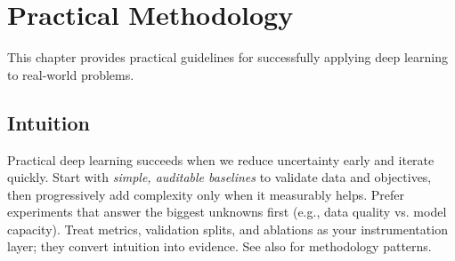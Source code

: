 
\chapter{Practical Methodology}
\label{chap:practical-methodology}

This chapter provides practical guidelines for successfully applying deep learning to real-world problems.


\begin{learningobjectives}
\end{learningobjectives}



\section*{Intuition}

Practical deep learning succeeds when we reduce uncertainty early and iterate quickly. Start with \emph{simple, auditable baselines} to validate data and objectives, then progressively add complexity only when it measurably helps. Prefer experiments that answer the biggest unknowns first (e.g., data quality vs. model capacity). Treat metrics, validation splits, and ablations as your instrumentation layer; they convert intuition into evidence. See also \textcite{GoodfellowEtAl2016} for methodology patterns.












